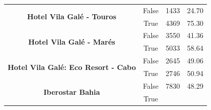 \begin{table}[h]
\begin{tabular}{|c|c|r|r|}
		\multirow{2}{*}{\textbf{Hotel Vila Galé - Touros}}                      &
		False                                                                   &
		1433                                                                    &
		24.70                                                                     \\ \cline{2-4}
		                                                                        &
		True                                                                    &
		4369                                                                    &
		75.30                                                                     \\ \hline
		\multirow{2}{*}{\textbf{Hotel Vila Galé - Marés}}                       &
		False                                                                   &
		3550                                                                    &
		41.36                                                                     \\ \cline{2-4}
		                                                                        &
		True                                                                    &
		5033                                                                    &
		58.64                                                                     \\ \hline
		\multirow{2}{*}{\textbf{Hotel Vila Galé: Eco Resort - Cabo}}            &
		False                                                                   &
		2645                                                                    &
		49.06                                                                     \\ \cline{2-4}
		                                                                        &
		True                                                                    &
		2746                                                                    &
		50.94                                                                     \\ \hline
		\multirow{2}{*}{\textbf{Iberostar Bahia}}                               &
		False                                                                   &
		7830                                                                    &
		48.29                                                                     \\ \cline{2-4}
		                                                                        &
		True                                                                    &

\end{tabular}
\end{table}
